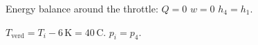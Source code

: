 Energy balance around the throttle:  
\( Q = 0 \)  
\( w = 0 \)  
\( h_4 = h_1 \).  

\( T_{\text{verd}} = T_i - 6 \, \text{K} = 40 \, \text{C} \).  
\( p_i = p_4 \).